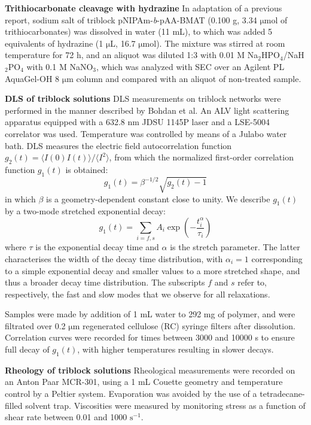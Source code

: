 \documentclass{article}
\begin{document}
\textbf{Trithiocarbonate cleavage with hydrazine}
In adaptation of a previous report,\cite{Shen2010}  
sodium salt of triblock pNIPAm-\emph{b}-pAA-BMAT (0.100 g, 3.34 $\mathrm{\mu}$mol of
trithiocarbonates) was dissolved in water (11 mL), to which was added 5 equivalents of
hydrazine (1 $\mathrm{\mu}$L, 16.7 $\mathrm{\mu}$mol). The mixture was stirred at room temperature
for 72 h, and an aliquot was diluted 1:3 with 0.01 M Na$_2$HPO$_4$/NaH$_2$PO$_4$ with
0.1 M NaNO$_3$, which was analyzed with SEC over an Agilent PL AquaGel-OH 8 $\mathrm{\mu}$m column
and compared with an aliquot of non-treated sample.

\textbf{DLS of triblock solutions}
DLS measurements on triblock networks were performed in the manner described by
Bohdan et al.\cite{Bohdan2016} An ALV light scattering apparatus 
equipped with a 632.8 nm JDSU 1145P laser and a LSE-5004 correlator was used. Temperature was 
controlled by means of a Julabo water bath. DLS measures the electric field autocorrelation function 
$g_2(t) = {\langle I(0)I(t) \rangle}/{\langle I^2 \rangle}$, from which the normalized 
first-order correlation function $g_1(t)$ is obtained:
\begin{equation}
g_1(t) = \beta^{-1/2}\sqrt{g_2(t) - 1}
\end{equation}
in which $\beta$ is a geometry-dependent constant close to unity. We describe 
$g_1(t)$ by a two-mode stretched exponential decay:
\begin{equation} \label{eqn:bistrexp}
g_1(t) = \sum\limits_{i=f,s}A_i\exp(-\frac{t^\alpha_i}{\tau_i})
\end{equation}
where $\tau$ is the exponential decay time and $\alpha$ is the stretch parameter. The latter
characterises the width of the decay time distribution, with $\alpha_i=1$ corresponding to
a simple exponential decay and smaller values to a more stretched shape, and thus a broader
decay time distribution. The subscripts $f$ and $s$ refer to, respectively, the fast and
slow modes that we observe for all relaxations.\cite{Thuresson1999} 

Samples were made by addition of 1 mL water to 292 mg of polymer, and were filtrated over 
0.2 $\mathrm{\mu m}$ regenerated cellulose (RC) syringe filters after dissolution. 
Correlation curves were recorded for times between 3000 and 10000 s to ensure full 
decay of $g_1(t)$, with higher temperatures resulting in slower decays.

\textbf{Rheology of triblock solutions}
Rheological measurements were recorded on an Anton Paar MCR-301, using a 1 mL Couette geometry and temperature
control by a Peltier system. Evaporation was avoided by the use of a tetradecane-filled solvent trap. Viscosities
were measured by monitoring stress as a function of shear rate between 0.01 and 1000 $\mathrm{s}^{-1}$.
\end{document}
